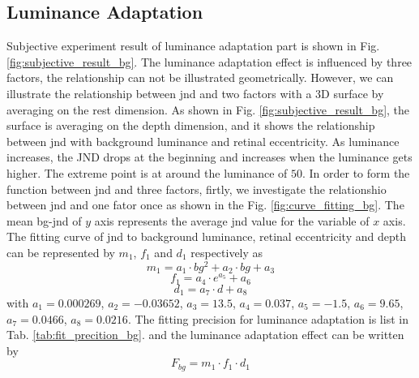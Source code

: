 \documentclass[journal]{IEEEtran}
\begin{document}
\subsection{Luminance Adaptation}
Subjective experiment result of luminance adaptation part is shown in Fig. \ref{fig:subjective_result_bg}. The luminance adaptation effect is influenced by three factors, the relationship can not be illustrated geometrically. However, we can illustrate the relationship between jnd and two factors with a 3D surface by averaging on the rest dimension. As shown in Fig. \ref{fig:subjective_result_bg}, the surface is averaging on the depth dimension, and it shows the relationship between jnd with background luminance and retinal eccentricity. As luminance increases, the JND drops at the beginning and increases when the luminance gets higher. The extreme point is at around the luminance of $50$. In order to form the function between jnd and three factors, firtly, we investigate the relationshio between jnd and one fator once as shown in the Fig. \ref{fig:curve_fitting_bg}. The mean bg-jnd of $y$ axis represents the average jnd value for the variable of $x$ axis. The fitting curve of jnd to background luminance, retinal eccentricity and depth can be represented by $m_1$, $f_1$ and $d_1$ respectively as
\begin{equation}
m_1=a_1\cdot bg^2+a_2\cdot bg+a_3
\end{equation}
\begin{equation}
f_1=a_4\cdot e^{a_5}+a_6
\end{equation}
\begin{equation}
d_1=a_7\cdot d+a_8
\end{equation}
with $a_1=0.000269$, $a_2=-0.03652$, $a_3=13.5$, $a_4=0.037$, $a_5=-1.5$, $a_6=9.65$, $a_7=0.0466$, $a_8=0.0216$. The fitting precision for luminance adaptation is list in Tab. \ref{tab:fit_precition_bg}.
and the luminance adaptation effect can be written by
\begin{equation}
F_{bg}=m_1\cdot f_1 \cdot d_1
\end{equation}
\end{document}
